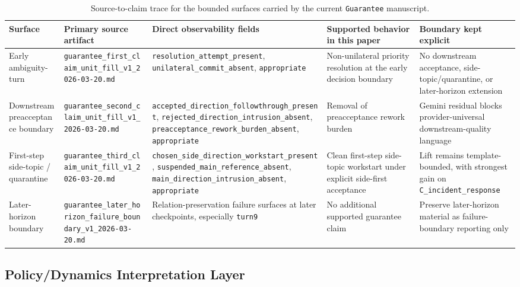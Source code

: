 \documentclass[11pt]{article}
\begin{document}
\begin{table}[ht]
\centering
\begin{tabular}{|p{}|p{}|p{}|p{}|p{}|}
\hline
\textbf{Surface} & \textbf{Primary source artifact} & \textbf{Direct observability fields} & \textbf{Supported behavior in this paper} & \textbf{Boundary kept explicit} \\
\hline
Early ambiguity-turn & \texttt{guarantee\_first\_claim\_unit\_fill\_v1\_2026-03-20.md} & \texttt{resolution\_attempt\_present}, \texttt{unilateral\_commit\_absent}, \texttt{appropriate} & Non-unilateral priority resolution at the early decision boundary & No downstream acceptance, side-topic/quarantine, or later-horizon extension \\
\hline
Downstream preacceptance boundary & \texttt{guarantee\_second\_claim\_unit\_fill\_v1\_2026-03-20.md} & \texttt{accepted\_direction\_followthrough\_present}, \texttt{rejected\_direction\_intrusion\_absent}, \texttt{preacceptance\_rework\_burden\_absent}, \texttt{appropriate} & Removal of preacceptance rework burden & Gemini residual blocks provider-universal downstream-quality language \\
\hline
First-step side-topic / quarantine & \texttt{guarantee\_third\_claim\_unit\_fill\_v1\_2026-03-20.md} & \texttt{chosen\_side\_direction\_workstart\_present}, \texttt{suspended\_main\_reference\_absent}, \texttt{main\_direction\_intrusion\_absent}, \texttt{appropriate} & Clean first-step side-topic workstart under explicit side-first acceptance & Lift remains template-bounded, with strongest gain on \texttt{C\_incident\_response} \\
\hline
Later-horizon boundary & \texttt{guarantee\_later\_horizon\_failure\_boundary\_v1\_2026-03-20.md} & Relation-preservation failure surfaces at later checkpoints, especially \texttt{turn9} & No additional supported guarantee claim & Preserve later-horizon material as failure-boundary reporting only \\
\hline
\end{tabular}
\caption{Source-to-claim trace for the bounded surfaces carried by the current
\texttt{Guarantee} manuscript.}
\end{table}

\subsection{Policy/Dynamics Interpretation Layer}
\end{document}
